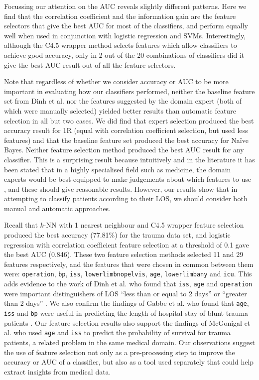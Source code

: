 


Focussing our attention on the AUC reveals slightly different patterns. Here we
find that the correlation coefficient and the information gain are the feature
selectors that give the best AUC for most of the classifiers, and perform
equally well when used in conjunction with logistic regression and SVMs.
Interestingly, although the C4.5
wrapper method selects features which allow classifiers to achieve good
accuracy, only in 2 out of the 20 combinations of classifiers did it give the
best AUC result out of all the feature selectors. 

Note that regardless of whether we consider accuracy or AUC to be more
important in evaluating how our classifiers performed, neither the baseline
feature set from Dinh et al. \cite{Dinh2013a} nor the features suggested by
the domain expert (both of which were manually selected) yielded better
results than automatic feature selection in all but two cases. We did find
that expert selection produced the best accuracy result for 1R (equal with
correlation coefficient selection, but used less features) and that the
baseline feature set produced the best accuracy for Na\"{i}ve Bayes. Neither
feature selection method produced the best AUC result for any classifier.
This is a surprising result because intuitively and in the literature it
has been stated that in a highly specialised field such as medicine, the domain
experts would be best-equipped to make judgements about which features to
use \cite{Witten2005}, and these should give reasonable results. However,
our results show that in attempting to classify patients according to their
LOS, we should consider both manual and automatic approaches.

Recall that $k$-NN with 1 nearest neighbour and C4.5 wrapper feature
selection produced the best accuracy (77.81\%) for the trauma data set, and
logistic regression with correlation coefficient feature selection at a
threshold of 0.1 gave the best AUC (0.846). These two feature selection
methods selected 11 and 29 features respectively, and the features that
were chosen in common between them were: \texttt{operation}, \texttt{bp},
\texttt{iss}, \texttt{lowerlimbnopelvis}, \texttt{age}, \texttt{lowerlimbany}
and \texttt{icu}. This adds evidence to the work of Dinh et al. who found
that \texttt{iss}, \texttt{age} and \texttt{operation} were important
distinguishers of LOS ``less than or equal to 2 days'' or ``greater than 2 days'' \cite{Dinh2013a}. We also
confirm the findings of Gabbe et al. who found that \texttt{age},
\texttt{iss} and \texttt{bp} were useful in predicting the length of
hospital stay of blunt trauma patients \cite{Gabbe2005}. Our feature
selection results also
support the findings of McGonigal et al. \cite{McGonigal1993} who used
\texttt{age} and
\texttt{iss} to predict the probability of survival for trauma patients, a
related problem in the same medical domain.
Our observations suggest the use of feature selection not only as a
pre-processing step to improve the accuracy or AUC of a classifier, but also
as a tool used separately that could help extract insights from medical data.

